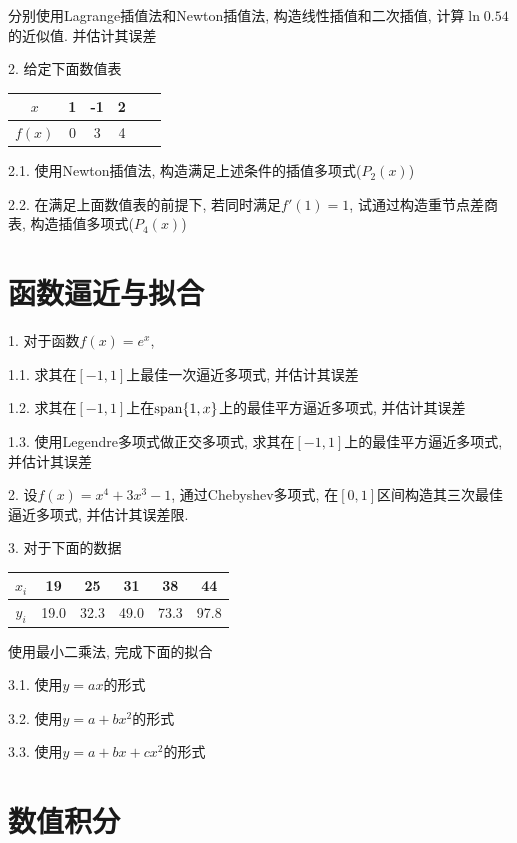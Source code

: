 分别使用Lagrange插值法和Newton插值法, 构造线性插值和二次插值, 计算$\ln0.54$的近似值. 并估计其误差

2. 给定下面数值表
\begin{table}[h!]
    \begin{tabular}{c|ccccc}
        \hline
        $x$&1&-1&2\\
        \hline
        $f(x)$&0&3&4\\
        \hline
    \end{tabular}
\end{table}

2.1. 使用Newton插值法, 构造满足上述条件的插值多项式($P_2(x)$)

2.2. 在满足上面数值表的前提下, 若同时满足$f'(1)=1$, 试通过构造重节点差商表, 构造插值多项式($P_4(x)$)

\section*{函数逼近与拟合}

1. 对于函数$f(x)=e^x$, 

1.1. 求其在$[-1,1]$上最佳一次逼近多项式, 并估计其误差

1.2. 求其在$[-1,1]$上在$\text{span}\{1,x\}$上的最佳平方逼近多项式, 并估计其误差

1.3. 使用Legendre多项式做正交多项式, 求其在$[-1,1]$上的最佳平方逼近多项式, 并估计其误差

2. 设$f(x)=x^4+3x^3-1$, 通过Chebyshev多项式, 在$[0,1]$区间构造其三次最佳逼近多项式, 并估计其误差限.

3. 对于下面的数据

\begin{table}[h!]
    \begin{tabular}{c|ccccc}
        \hline
        $x_i$&19&25&31&38&44\\
        \hline
        $y_i$&19.0&32.3&49.0&73.3&97.8\\
        \hline
    \end{tabular}
\end{table}

使用最小二乘法, 完成下面的拟合

3.1. 使用$y=ax$的形式

3.2. 使用$y=a+bx^2$的形式

3.3. 使用$y=a+bx+cx^2$的形式

\section*{数值积分}

